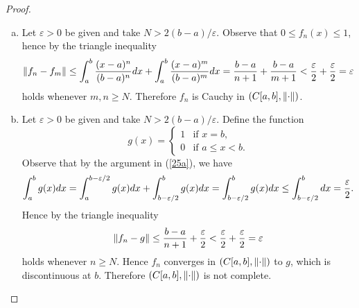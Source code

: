 \documentclass[10pt]{amsart}
\begin{document}
\begin{ex25}{}
\begin{proof}
\begin{enumerate}[(a)]
      The remaining axioms follow from the triangle inequality for $\abs{\cdot}$ and calculus.
      Namely, $\abs{(f + g)(x)} \leq \abs{f(x)} + \abs{g(x)}$ implies 
	  $$\norm{f+g} = \int_a^b\abs{(f+g)(x)}dx \leq \int_a^b\abs{f(x)}dx + \int_a^b\abs{g(x)}dx = \norm{f} + \norm{g},$$
	  and for any $a \in \mathbb{R}$, $$\norm{af} = \abs{a}\int_a^b\abs{f(x)}dx = \abs{a}\norm{f}.$$
    \item
      Let $\varepsilon > 0$ be given and take $N > 2(b-a)/\varepsilon$.
      Observe that $0 \leq f_n(x) \leq 1$, hence by the triangle inequality
      $$\lVert f_n - f_m\rVert \leq \int_a^b \frac{(x-a)^n}{(b-a)^n}dx + \int_a^b\frac{(x-a)^m}{(b-a)^m}dx = \frac{b-a}{n+1} + \frac{b-a}{m+1} < \frac{\varepsilon}{2} + \frac{\varepsilon}{2}= \varepsilon$$
      holds whenever $m,n \geq N$.
      Therefore $f_n$ is Cauchy in $(C[a,b], \lVert\cdot\rVert)$.
    \item
      Let $\varepsilon > 0$ be given and take $N > 2(b-a)/\varepsilon$.
      Define the function
      $$g(x) = 
      \left\{
      \begin{array}{ll}
        1 & \text{if } x = b,\\
        0 & \text{if } a \leq x < b.
      \end{array}
      \right.$$
      Observe that by the argument in (\ref{25a}), we have
	  $$\int_a^b g(x)dx\\ = \int_a^{b-\varepsilon/2} g(x)dx\\ + \int_{b-\varepsilon/2}^bg(x)dx = \int_{b-\varepsilon/2}^bg(x)dx \leq \int_{b-\varepsilon/2}^b dx = \frac{\varepsilon}{2}.$$
      Hence by the triangle inequality 
      $$
        \lVert f_n - g\rVert \leq \frac{b-a}{n+1} + \frac{\varepsilon}{2} < \frac{\varepsilon}{2} + \frac{\varepsilon}{2} = \varepsilon
      $$
      holds whenever $n \geq N$.
      Hence $f_n$ converges in $(C[a,b], \lVert\cdot\rVert)$ to $g$, which is discontinuous at $b$.
	  Therefore $(C[a,b], \lVert\cdot\rVert)$ is not complete.
    \end{enumerate}
  \end{proof}
\end{ex25}{}
\end{document}
